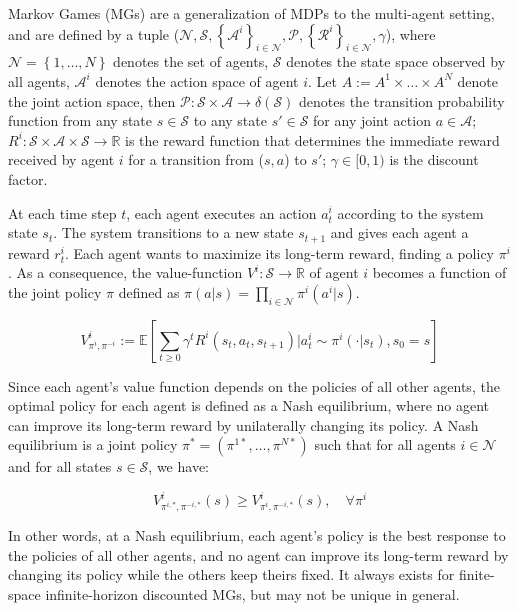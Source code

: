 Markov Games (MGs) are a generalization of MDPs to the multi-agent setting, and are defined by a tuple ($\mathcal{N}, \mathcal{S}, \left\{\mathcal{A}^i\right\}_{i\in\mathcal{N}}, \mathcal{P}, \left\{\mathcal{R}^i\right\}_{i\in\mathcal{N}}, \gamma$), where $\mathcal{N} = \left\{1,\dots,N\right\}$ denotes the set of agents, $\mathcal{S}$ denotes the state space observed by all agents, $\mathcal{A}^i$ denotes the action space of agent $i$.
Let $A:=A^1\times\dots\times A^N$ denote the joint action space, then $\mathcal{P}:\mathcal{S}\times \mathcal{A}\to\delta(\mathcal{S})$ denotes the transition probability function from any state $s\in\mathcal{S}$ to any state $s'\in\mathcal{S}$ for any joint action $a\in\mathcal{A}$; $R^i:\mathcal{S}\times\mathcal{A}\times\mathcal{S}\to\mathbb{R}$ is the reward function that determines the immediate reward received by agent $i$ for a transition from ($s,a$) to $s'$; $\gamma \in [0,1)$ is the discount factor.

At each time step $t$, each agent executes an action $a^i_t$ according to the system state $s_t$. The system transitions to a new state $s_{t+1}$ and gives each agent a reward $r^i_t$. Each agent wants to maximize its long-term reward, finding a policy $\pi^i$. As a consequence, the value-function $V^i : \mathcal{S}\to\mathbb{R}$ of agent $i$ becomes a function of the joint policy $\pi$ defined as $\pi(a|s) = \prod_{i\in\mathcal{N}}\pi^i(a^i|s)$.

\begin{equation}
    V^i_{\pi^i,\pi^{-i}} := \mathbb{E}\left[\sum_{t\geq 0}\gamma^t R^i(s_t,a_t,s_{t+1}) | a^i_t \sim \pi^i(\cdot | s_t), s_0 = s\right]
\end{equation}

Since each agent's value function depends on the policies of all other agents, the optimal policy for each agent is defined as a Nash equilibrium, where no agent can improve its long-term reward by unilaterally changing its policy.
A Nash equilibrium is a joint policy $\pi^* = (\pi^{1*},\dots,\pi^{N*})$ such that for all agents $i\in\mathcal{N}$ and for all states $s\in\mathcal{S}$, we have:

\begin{equation}
    V^i_{\pi^{i,*},\pi^{-i,*}}(s) \geq V^i_{\pi^i,\pi^{-i,*}}(s), \quad \forall \pi^i
\end{equation}

In other words, at a Nash equilibrium, each agent's policy is the best response to the policies of all other agents, and no agent can improve its long-term reward by changing its policy while the others keep theirs fixed.
It always exists for finite-space infinite-horizon discounted MGs, but may not be unique in general.

